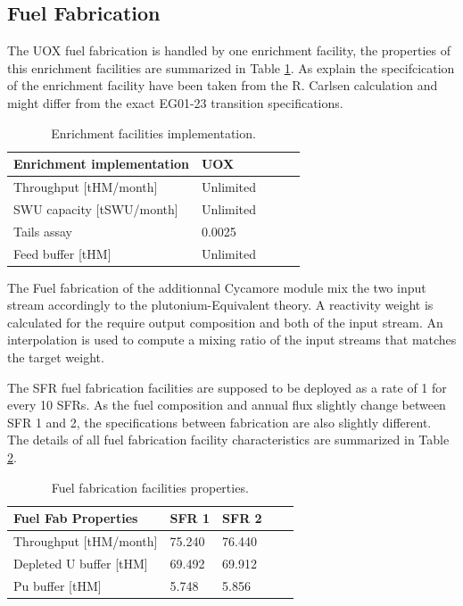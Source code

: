 \documentclass[12pt]{article}
\begin{document}
\subsection{Fuel Fabrication}

The UOX fuel fabrication is handled by one enrichment facility, the properties
of this enrichment facilities are summarized in Table \ref{tab:enrich_1}. As
explain the specifcication of the enrichment facility have been taken from the
R. Carlsen calculation and might differ from the exact EG01-23 transition
specifications. 

\begin{table}[h!]
    \centering
    \begin{tabular}{lllll}
    \hline
    Enrichment implementation  &  UOX        \\
    \hline
    Throughput [tHM/month]     &  Unlimited  \\
    SWU capacity [tSWU/month]  &  Unlimited  \\
    Tails assay                &  0.0025     \\
    Feed buffer [tHM]          &  Unlimited  \\
    \hline
    \end{tabular}
    \caption{Enrichment facilities implementation. }
    \label{tab:enrich_1}
\end{table}

The Fuel fabrication of the additionnal Cycamore module mix the two
input stream accordingly to the plutonium-Equivalent theory\cite{Pueq}. A
reactivity weight is calculated for the require output composition and both of
the input stream. An interpolation is used to compute a mixing ratio of the input
streams that matches the target weight.


The SFR fuel fabrication facilities are supposed to be deployed as a rate of 1
for every 10 SFRs.  As the fuel composition and annual flux slightly change
between SFR 1 and 2, the specifications between fabrication are also slightly
different. The details of all fuel fabrication facility characteristics are
summarized in Table \ref{tab:fuelfab_1}.

\begin{table}[h!]
    \centering
    \begin{tabular}{lllll}
    \hline
    Fuel Fab Properties      &  SFR 1   &  SFR 2   \\
    \hline
    Throughput [tHM/month]   &  75.240  &  76.440  \\
    Depleted U buffer [tHM]  &  69.492  &  69.912  \\
    Pu buffer  [tHM]         &  5.748   &  5.856   \\
    \hline
    \end{tabular}
    \caption{Fuel fabrication facilities properties.}
    \label{tab:fuelfab_1}
\end{table}
\end{document}
